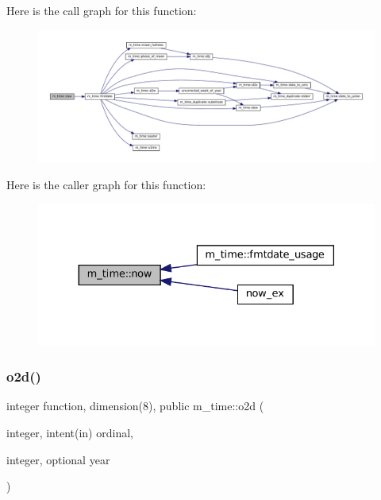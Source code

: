 Here is the call graph for this function\+:\nopagebreak
\begin{figure}[H]
\begin{center}
\leavevmode
\includegraphics[width=350pt]{namespacem__time_a6b5e87be0e510ff268c1ecfbf67a3bdb_cgraph}
\end{center}
\end{figure}
Here is the caller graph for this function\+:\nopagebreak
\begin{figure}[H]
\begin{center}
\leavevmode
\includegraphics[width=330pt]{namespacem__time_a6b5e87be0e510ff268c1ecfbf67a3bdb_icgraph}
\end{center}
\end{figure}
\mbox{\label{namespacem__time_a55e2cb9efc9d4d209ae2864f073d4f19}} 
\subsubsection{\texorpdfstring{o2d()}{o2d()}}
{\footnotesize\ttfamily integer function, dimension(8), public m\+\_\+time\+::o2d (\begin{DoxyParamCaption}\item[{integer, intent(in)}]{ordinal,  }\item[{integer, optional}]{year }\end{DoxyParamCaption})}



